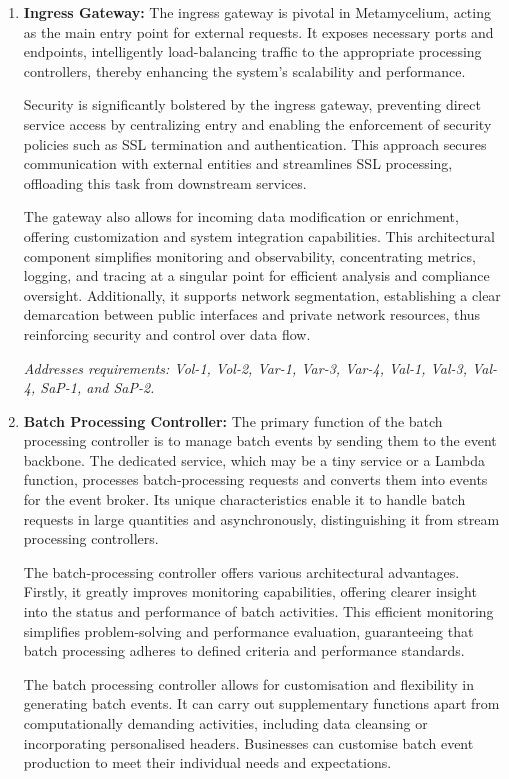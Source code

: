 \documentclass[journal]{IEEEtran}
\begin{document}
\begin{enumerate}
    \item \textbf{Ingress Gateway:} The ingress gateway is pivotal in Metamycelium, acting as the main entry point for external requests. It exposes necessary ports and endpoints, intelligently load-balancing traffic to the appropriate processing controllers, thereby enhancing the system's scalability and performance.

    Security is significantly bolstered by the ingress gateway, preventing direct service access by centralizing entry and enabling the enforcement of security policies such as SSL termination and authentication. This approach secures communication with external entities and streamlines SSL processing, offloading this task from downstream services.
    
    The gateway also allows for incoming data modification or enrichment, offering customization and system integration capabilities. This architectural component simplifies monitoring and observability, concentrating metrics, logging, and tracing at a singular point for efficient analysis and compliance oversight. Additionally, it supports network segmentation, establishing a clear demarcation between public interfaces and private network resources, thus reinforcing security and control over data flow.
    

    \textit{Addresses requirements: Vol-1, Vol-2, Var-1, Var-3, Var-4, Val-1, Val-3, Val-4, SaP-1, and SaP-2.}



    \item \textbf{Batch Processing Controller:} The primary function of the batch processing controller is to manage batch events by sending them to the event backbone. The dedicated service, which may be a tiny service or a Lambda function, processes batch-processing requests and converts them into events for the event broker. Its unique characteristics enable it to handle batch requests in large quantities and asynchronously, distinguishing it from stream processing controllers.

    The batch-processing controller offers various architectural advantages. Firstly, it greatly improves monitoring capabilities, offering clearer insight into the status and performance of batch activities. This efficient monitoring simplifies problem-solving and performance evaluation, guaranteeing that batch processing adheres to defined criteria and performance standards.
    
    The batch processing controller allows for customisation and flexibility in generating batch events. It can carry out supplementary functions apart from computationally demanding activities, including data cleansing or incorporating personalised headers. Businesses can customise batch event production to meet their individual needs and expectations.
    

\end{enumerate}
\end{document}
